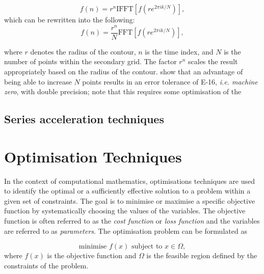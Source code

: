\documentclass[a4paper]{report}
\begin{document}
\begin{equation}\label{cavers}
	f(n) = r^n \text{IFFT}[f(re^{2\pi ik / N})],
\end{equation}
which can be rewritten into the following:
\begin{equation}
		f(n) = \frac{r^n}{N} \text{FFT}[f(re^{2\pi ik / N})],
\end{equation}

where $r$ denotes the radius of the contour, $n$ is the time index, and $N$ is the number of points within the secondary grid. The factor $r^n$ scales the result appropriately based on the radius of the contour. \citet{loveless2021guido} show that an advantage of being able to increase $N$ points results in an error tolerance of E-16, \textit{i.e. machine zero}, with double precision; note that this requires some optimisation of the 


\subsection{Series acceleration techniques}


\section{Optimisation Techniques}
In the context of computational mathematics, optimisations techniques are used to identify the optimal or a sufficiently effective solution to a problem within a given set of constraints. The goal is to minimise or maximise a specific objective function by systematically choosing the values of the variables. The objective function is often referred to as the \textit{cost function} or \textit{loss function} and the variables are referred to as \textit{parameters}. The optimisation problem can be formulated as

\begin{equation}\label{optimisation_problem}
	\text{minimise } f(x) \text{ subject to } x \in \Omega,
\end{equation}
where $f(x)$ is the objective function and $\Omega$ is the feasible region defined by the constraints of the problem.
\end{document}
